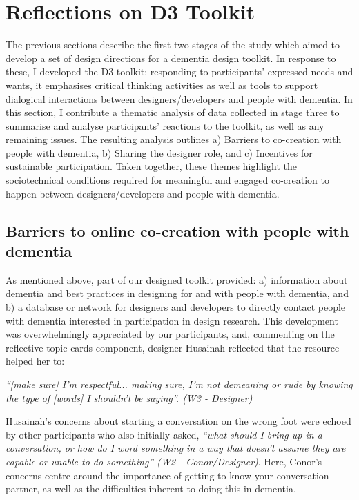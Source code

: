 \section{Reflections on D3 Toolkit}
\label{D3:Reflections}
The previous sections describe the first two stages of the study which aimed to develop a set of design directions for a dementia design toolkit. In response to these, I developed the D3 toolkit: responding to participants’ expressed needs and wants, it emphasises critical thinking activities as well as tools to support dialogical interactions between designers/developers and people with dementia. In this section, I contribute a thematic analysis of data collected in stage three to summarise and analyse participants’ reactions to the toolkit, as well as any remaining issues. The resulting analysis outlines a) Barriers to co-creation with people with dementia, b) Sharing the designer role, and c) Incentives for sustainable participation. Taken together, these themes highlight the sociotechnical conditions required for meaningful and engaged co-creation to happen between designers/developers and people with dementia. 

\subsection{Barriers to online co-creation with people with dementia}
As mentioned above, part of our designed toolkit provided: a) information about dementia and best practices in designing for and with people with dementia, and b) a database or network for designers and developers to directly contact people with dementia interested in participation in design research. This development was overwhelmingly appreciated by our participants, and, commenting on the reflective topic cards component, designer Husainah reflected that the resource helped her to:

\textit{
 ``[make sure] I'm respectful... making sure, I'm not demeaning or rude by knowing the type of [words] I shouldn't be saying''. (W3 - Designer)}
 
Husainah’s concerns about starting a conversation on the wrong foot were echoed by other participants who also initially asked, \textit{``what should I bring up in a conversation, or how do I word something in a way that doesn't assume they are capable or unable to do something'' (W2 - Conor/Designer)}. Here, Conor’s concerns centre around the importance of getting to know your conversation partner, as well as the difficulties inherent to doing this in dementia. 

